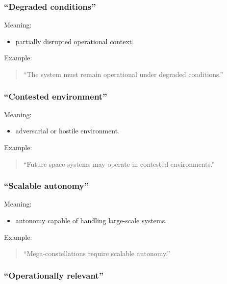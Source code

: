 \documentclass[10pt,a4paper,twocolumn]{article}
\begin{document}
\subsubsection*{``Degraded conditions''}

Meaning:
\begin{itemize}
    \item partially disrupted operational context.
\end{itemize}

Example:
\begin{quote}
    ``The system must remain operational under degraded conditions.''
\end{quote}


\subsubsection*{``Contested environment''}

Meaning:
\begin{itemize}
    \item adversarial or hostile environment.
\end{itemize}

Example:
\begin{quote}
    ``Future space systems may operate in contested environments.''
\end{quote}


\subsubsection*{``Scalable autonomy''}

Meaning:
\begin{itemize}
    \item autonomy capable of handling large-scale systems.
\end{itemize}

Example:
\begin{quote}
    ``Mega-constellations require scalable autonomy.''
\end{quote}


\subsubsection*{``Operationally relevant''}
\end{document}
